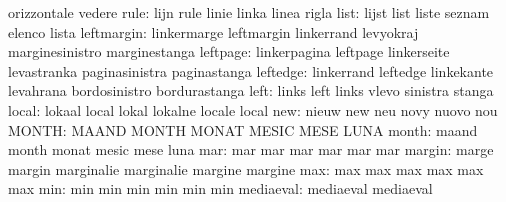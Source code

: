                            orizzontale               vedere
                     rule: lijn                      rule
                           linie                     linka
                           linea                     rigla
                     list: lijst                     list
                           liste                     seznam
                           elenco                    lista
               leftmargin: linkermarge               leftmargin
                           linkerrand                levyokraj
                           marginesinistro           marginestanga
                 leftpage: linkerpagina              leftpage
                           linkerseite               levastranka
                           paginasinistra            paginastanga
                 leftedge: linkerrand                leftedge
                           linkekante                levahrana
                           bordosinistro             bordurastanga
                     left: links                     left
                           links                     vlevo
                           sinistra                  stanga
                    local: lokaal                    local
                           lokal                     lokalne
                           locale                    local
                      new: nieuw                     new
                           neu                       novy
                           nuovo                     nou
                    MONTH: MAAND                     MONTH
                           MONAT                     MESIC
                           MESE                      LUNA
                    month: maand                     month
                           monat                     mesic
                           mese                      luna
                      mar: mar                       mar
                           mar                       mar
                           mar                       mar
                   margin: marge                     margin
                           marginalie                marginalie
                           margine                   margine
                      max: max                       max
                           max                       max
                           max                       max
                      min: min                       min
                           min                       min
                           min                       min
                mediaeval: mediaeval                 mediaeval
